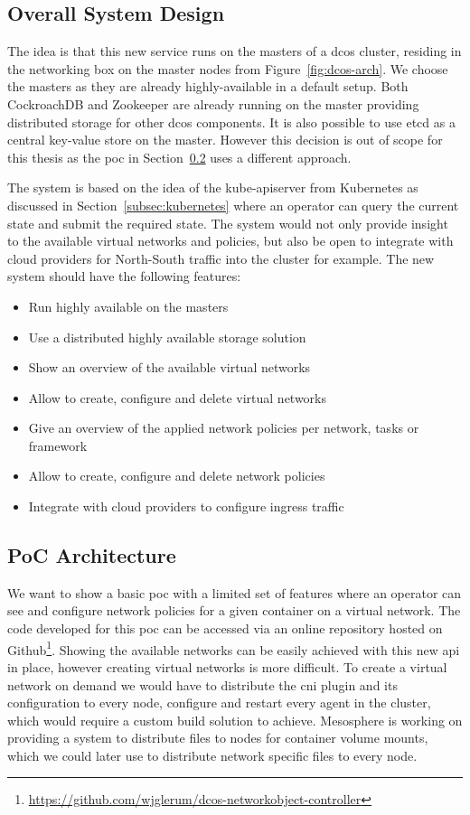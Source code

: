 \subsection{Overall System Design}
\label{subsec:system-design}
The idea is that this new service runs on the masters of a \gls{dcos} cluster, residing in the networking box on the master nodes from Figure~\ref{fig:dcos-arch}. We choose the masters as they are already highly-available in a default setup. Both CockroachDB\cite{cockroachdb} and Zookeeper\cite{zookeeper} are already running on the master providing distributed storage for other \gls{dcos} components. It is also possible to use etcd\cite{etcd} as a central key-value store on the master. However this decision is out of scope for this thesis as the \gls{poc} in Section~\ref{subsec:poc-architecture} uses a different approach.

The system is based on the idea of the kube-apiserver from Kubernetes as discussed in Section~\ref{subsec:kubernetes} where an operator can query the current state and submit the required state. The system would not only provide insight to the available virtual networks and policies, but also be open to integrate with cloud providers for North-South traffic into the cluster for example. The new system should have the following features: 
\begin{itemize}
    \item Run highly available on the masters
    \item Use a distributed highly available storage solution
    \item Show an overview of the available virtual networks
    \item Allow to create, configure and delete virtual networks
    \item Give an overview of the applied network policies per network, tasks or framework
    \item Allow to create, configure and delete network policies
    \item Integrate with cloud providers to configure ingress traffic
\end{itemize}

\subsection{PoC Architecture}
\label{subsec:poc-architecture}
We want to show a basic \gls{poc} with a limited set of features where an operator can see and configure network policies for a given container on a virtual network. The code developed for this \gls{poc} can be accessed via an online repository hosted on Github\footnote{\url{https://github.com/wjglerum/dcos-networkobject-controller}\label{ftn:repo}}. Showing the available networks can be easily achieved with this new \gls{api} in place, however creating virtual networks is more difficult. To create a virtual network on demand we would have to distribute the \gls{cni} plugin and its configuration to every node, configure and restart every agent in the cluster, which would require a custom build solution to achieve. Mesosphere is working on providing a system to distribute files to nodes for container volume mounts, which we could later use to distribute network specific files to every node.

